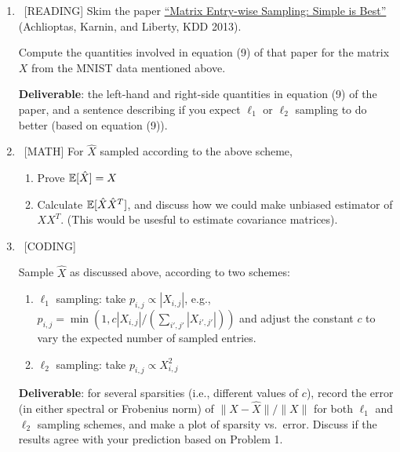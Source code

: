 \documentclass[10pt, letterpaper]{scrartcl}
\begin{document}
\begin{enumerate}[align=left, leftmargin=*, label=\sffamily\bfseries Problem \arabic*:]   
 
    \item \ [READING] Skim the paper \href{https://pdfs.semanticscholar.org/aa64/b8fb3382e42f90ee93a1dd0c78f13833963f.pdf}{``Matrix Entry-wise Sampling: Simple is Best''} (Achlioptas, Karnin, and Liberty, KDD 2013).
    
    Compute the quantities involved in equation (9) of that paper for the matrix $X$ from the MNIST data mentioned above.    

    
    \textbf{Deliverable}: the left-hand and right-side quantities in equation (9) of the paper, and a sentence describing if you expect $\ell_1$ or $\ell_2$ sampling to do better (based on equation (9)).

    \item \ [MATH] 
    For $\hat{X}$ sampled according to the above scheme, 
    \begin{enumerate}
        \item Prove $\operatorname{\mathbb{E}}[ \hat{X} ] = X$
        \item Calculate $\operatorname{\mathbb{E}}[ \hat{X}\hat{X}^T ]$, and discuss how we could make unbiased estimator of $XX^T$. (This would be usesful to estimate covariance matrices).
    \end{enumerate}
    
    
    \item \ [CODING] 
    

    Sample $\hat{X}$ as discussed above, according to two schemes:
    \begin{enumerate}
        \item $\ell_1$ sampling: take $p_{i,j} \propto |X_{i,j}|$, e.g.,
        $p_{i,j} = \min\left( 1, c |X_{i,j}|/( \sum_{i',j'}|X_{i',j'}| ) \right)$ and adjust the constant $c$ to vary the expected number of sampled entries.
        \item $\ell_2$ sampling: take $p_{i,j} \propto X_{i,j}^2$
    \end{enumerate}
    
        \textbf{Deliverable}: for several sparsities (i.e., different values of $c$), record the error (in either spectral or Frobenius norm) of $\|X-\hat{X}\|/\|X\|$ for both $\ell_1$ and $\ell_2$ sampling schemes, and make a plot of sparsity vs.\ error. Discuss if the results agree with your prediction based on Problem 1.
        

\end{enumerate}
\end{document}

